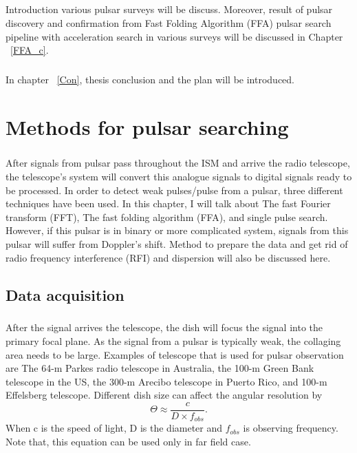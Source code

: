 \documentclass[thesis_msc.tex]{subfiles}
\begin{document}
    \paragraph{} Introduction various pulsar surveys will be discuss. Moreover, result of pulsar discovery and confirmation from Fast Folding Algorithm (FFA) pulsar search pipeline with acceleration search in various surveys will be discussed in Chapter ~\ref{FFA_c}. 
    \paragraph{} In chapter ~\ref{Con}, thesis conclusion and the plan will be introduced.
    
\chapter{Methods for pulsar searching} \label{Methods}
\paragraph{} After signals from pulsar pass throughout the ISM and arrive the radio telescope, the telescope's system will convert this analogue signals to digital signals ready to be processed. In order to detect weak pulses/pulse from a pulsar, three different techniques have been used. In this chapter, I will talk about The fast Fourier transform (FFT), The fast folding algorithm (FFA), and single pulse search. However, if this pulsar is in binary or more complicated system, signals from this pulsar will suffer from Doppler's shift.  Method to prepare the data and get rid of radio frequency interference (RFI) and dispersion will also be discussed here. 
    \section{Data acquisition}
		\paragraph{} After the signal arrives the telescope, the dish will focus the signal into the primary focal plane. As the signal from a pulsar is typically weak, the collaging area needs to be large. Examples of telescope that is used for pulsar observation are The 64-m Parkes radio telescope in Australia, the 100-m Green Bank telescope in the US, the 300-m Arecibo telescope in Puerto Rico, and 100-m Effelsberg telescope. Different dish size can affect the angular resolution by 
        \begin{equation} \label{angular_res}
        \Theta \approx \frac{c}{D \times f_{obs}}.
        \end{equation}
        When c is the speed of light, D is the diameter and $f_{obs}$ is observing frequency. Note that, this equation can be used only in far field case.
\end{document}
